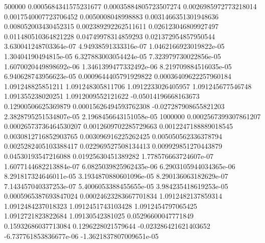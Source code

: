 {500000 0.0005684341575231677 0.00035884805723507274 0.0026985972773218014 0.0017540007723706452 0.0050008048998883 0.0031466351301948636 0.008052003430452315 0.002389292262511611 0.026123046809927497 0.011480510364821228 0.04749978314859293 0.021372954857950544 3.630041248703364e-07 4.94938591333316e-07 1.0462166923019822e-05 1.30404190494815e-05 6.327883003054424e-05 7.323979730022856e-05 1.6070020449898692e-06 1.3461399477332492e-06 8.219709884516035e-05 6.940628743956623e-05 0.0009644405791929822 0.00036409622257960184 1.091248825851211 1.091248305811706 1.0912233026405957 1.091245677546748 1.091355238020251 1.0912009552121622 -0.05014196668163673 0.12900506625369879 0.00015626494593762308 -0.027287908655821203 2.3828795251534807e-05 2.1968456643151058e-05
1000000 0.0002567399307861207 0.00026573736464530207 0.0012609702285729663 0.0012247188889018545 0.0030812716852903765 0.003096916225262425 0.005050562336378794 0.0025282405103388417 0.022969527508134413 0.009929851270443879 0.04530193547216088 0.01925630451389282 1.778576663724607e-07 1.6077144682213884e-07 6.0825039825962435e-06 6.2903105944034365e-06 8.291817324646011e-05 3.1934870880601096e-05 8.290136063182629e-07 7.143457040337253e-07 5.4006053388455655e-05 3.984235418619253e-05 0.0005965387693847024 0.00024623283667701834 1.0912482137859314 1.0912484237018323 1.0912451743103428 1.0912454797065425 1.0912721823822684 1.09130542381025 0.05296600047771849 0.15932686037713084 0.1296228021579644 -0.023286421621403652 -6.737761853836677e-06 -1.3621837807009651e-05
}\dataA

